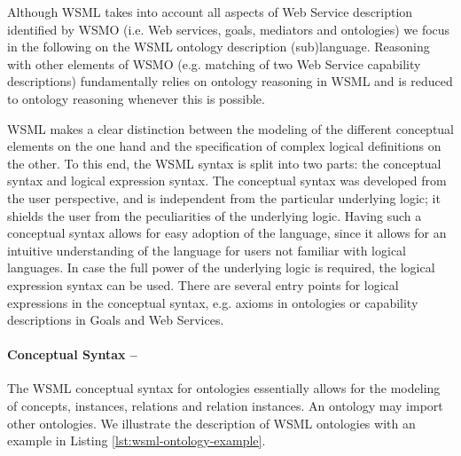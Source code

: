 Although WSML takes into account all aspects of Web Service
description identified by WSMO (i.e. Web services, goals,
mediators and ontologies) we focus in the following on the WSML
ontology description (sub)language. Reasoning with other elements
of WSMO (e.g. matching of two Web Service capability descriptions)
fundamentally relies on ontology reasoning in WSML and is reduced
to ontology reasoning whenever this is possible.

WSML makes a clear distinction between the modeling of the
different conceptual elements on the one hand and the
specification of complex logical definitions on the other. To this
end, the WSML syntax is split into two parts: the conceptual
syntax and logical expression syntax. The conceptual syntax was
developed from the user perspective, and is independent from the
particular underlying logic; it shields the user from the
peculiarities of the underlying logic. Having such a conceptual
syntax allows for easy adoption of the language, since it allows
for an intuitive understanding of the language for users not
familiar with logical languages. In case the full power of the
underlying logic is required, the logical expression syntax can be
used. There are several entry points for logical expressions in
the conceptual syntax, e.g. axioms in ontologies or capability
descriptions in Goals and Web Services.

\paragraph{\small Conceptual Syntax --}
\label{sec:conceptual-syntax}

The WSML conceptual syntax for ontologies essentially allows for
the modeling of concepts, instances, relations and relation
instances. An ontology may import other ontologies.
We illustrate the description of WSML ontologies with an example in Listing
\ref{lst:wsml-ontology-example}.

%
%

